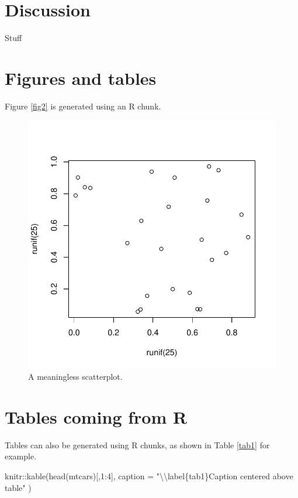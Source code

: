 \documentclass[preprint, 3p,
authoryear]{elsarticle} %
\newenvironment{Shaded}{\begin{snugshade}}{\end{snugshade}}
\newcommand{\AttributeTok}[1]{\textcolor[rgb]{0.77,0.63,0.00}{#1}}
\newcommand{\DecValTok}[1]{\textcolor[rgb]{0.00,0.00,0.81}{#1}}
\newcommand{\FunctionTok}[1]{\textcolor[rgb]{0.00,0.00,0.00}{#1}}
\newcommand{\NormalTok}[1]{#1}
\newcommand{\SpecialCharTok}[1]{\textcolor[rgb]{0.00,0.00,0.00}{#1}}
\newcommand{\StringTok}[1]{\textcolor[rgb]{0.31,0.60,0.02}{#1}}
\begin{document}
\hypertarget{discussion}{%
\section{Discussion}\label{discussion}}

Stuff

\hypertarget{figures-and-tables}{%
\section{Figures and tables}\label{figures-and-tables}}

Figure \ref{fig2} is generated using an R chunk.

\begin{figure}

{\centering \includegraphics[width=0.5\linewidth]{CatchCompWaterCol_files/figure-latex/fig2-1} 

}

\caption{\label{fig2}A meaningless scatterplot.}\label{fig:fig2}
\end{figure}

\hypertarget{tables-coming-from-r}{%
\section{Tables coming from R}\label{tables-coming-from-r}}

Tables can also be generated using R chunks, as shown in Table
\ref{tab1} for example.

\begin{Shaded}
\begin{Highlighting}[]
\NormalTok{knitr}\SpecialCharTok{::}\FunctionTok{kable}\NormalTok{(}\FunctionTok{head}\NormalTok{(mtcars)[,}\DecValTok{1}\SpecialCharTok{:}\DecValTok{4}\NormalTok{], }
    \AttributeTok{caption =} \StringTok{"}\SpecialCharTok{\textbackslash{}\textbackslash{}}\StringTok{label\{tab1\}Caption centered above table"}
\NormalTok{)}
\end{Highlighting}
\end{Shaded}
\end{document}
